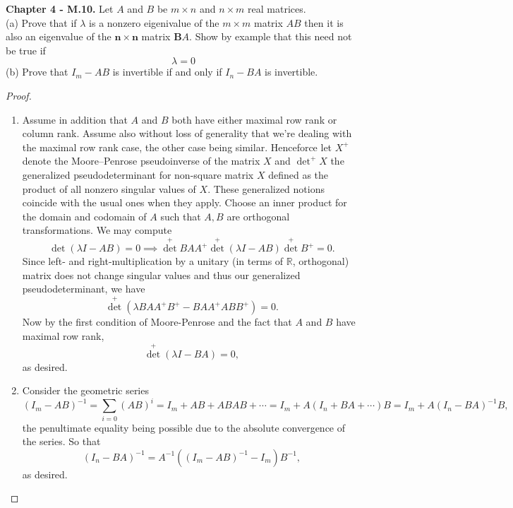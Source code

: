 \documentclass[10pt]{report}
\theoremstyle{definition}
\begin{document}
\textbf{Chapter 4 - M.10.} Let $A$ and $B$ be $m \times n$ and $n \times m$ real matrices.\\
(a) Prove that if $\lambda$ is a nonzero eigenivalue of the $m \times m$ matrix $A B$ then it is also an eigenvalue of the $\boldsymbol{n} \times \boldsymbol{n}$ matrix $\boldsymbol{B} A$. Show by example that this need not be true if
\[
\lambda=0
\]
(b) Prove that $I_{m}-A B$ is invertible if and only if $I_{n}-B A$ is invertible.
\begin{proof}{}\leavevmode{}
\begin{enumerate}[label=(\alph*)]
\item
Assume in addition that $A$ and $B$ both have either maximal row rank or column rank.
Assume also without loss of generality that we're dealing with the maximal row rank case, the other case being similar.
Henceforce let $X^+$ denote the Moore–Penrose pseudoinverse of the matrix $X$ and $\det^+X$ the generalized pseudodeterminant for non-square matrix $X$ defined as the product of all nonzero singular values of $X$.
These generalized notions coincide with the usual ones when they apply.
Choose an inner product for the domain and codomain of $A$ such that $A,B$ are orthogonal transformations.
We may compute
$$\det(\lambda I-AB)=0\implies\operatorname{det}^+BAA^+\operatorname{det}^+(\lambda I-AB)\operatorname{det}^+B^+=0.$$
Since left- and right-multiplication by a unitary (in terms of $\mathbb{R}$, orthogonal) matrix does not change singular values and thus our generalized pseudodeterminant, we have
$$\operatorname{det}^+(\lambda BAA^+B^+-BAA^+ABB^+)=0.$$
Now by the first condition of Moore-Penrose and the fact that $A$ and $B$ have maximal row rank,
$$\operatorname{det}^+(\lambda I-BA)=0,$$
as desired.
\item Consider the geometric series
$$(I_m-AB)^{-1}=\sum_{i=0}(AB)^i=I_m+AB+ABAB+\cdots=I_m+A(I_n+BA+\cdots)B=I_m+A(I_n-BA)^{-1}B,$$
the penultimate equality being possible due to the absolute convergence of the series.
So that
$$(I_n-BA)^{-1}=A^{-1}((I_m-AB)^{-1}-I_m)B^{-1},$$
as desired.
\end{enumerate}
\end{proof}
\end{document}
